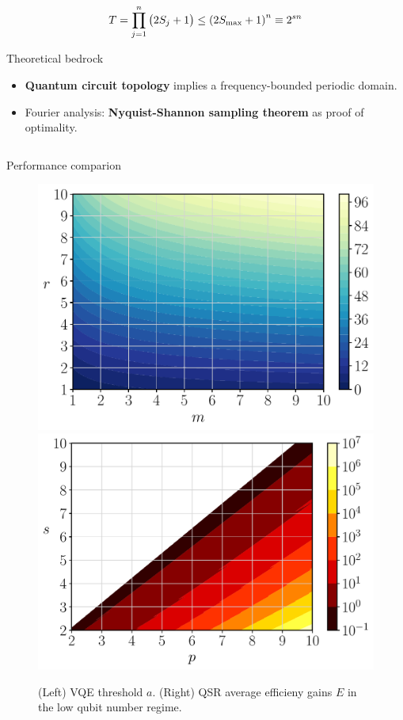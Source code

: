 \documentclass[final]{beamer}
\newlength{\onecolwid}
\newlength{\twocolwid}
\begin{document}
\begin{frame}[t]
\begin{columns}[t]
\begin{column}{\twocolwid}
\begin{columns}[t,totalwidth=\twocolwid]
\begin{column}{\onecolwid}
\begin{gather*} \label{eq:QSR-algorithm-samples}
  T = \prod_{j=1}^{n} \qty(2 S_{j} + 1) \leq
    \qty(2 S_\text{max} + 1)^{n} \equiv 2^{sn}
\end{gather*}

\begin{alertblock}{Theoretical bedrock}
  \begin{itemize}
    \item \textbf{Quantum circuit topology} implies a frequency-bounded periodic domain.
    \item Fourier analysis: \textbf{Nyquist-Shannon sampling theorem} as proof of optimality.
  \end{itemize}
\end{alertblock}


\end{column} %
\end{columns} %


\begin{alertblock}{Performance comparion}

  \begin{figure}
    \includegraphics[width=0.4\linewidth]{Figures/threshold.pdf}
    \includegraphics[width=0.4\linewidth]{Figures/efficiency.pdf}
    \caption{(Left) VQE threshold $a$. (Right) QSR average efficieny gains $E$ in the low qubit number regime.}
  \end{figure}


\end{alertblock}
\end{column}
\end{columns}
\end{frame}
\end{document}
